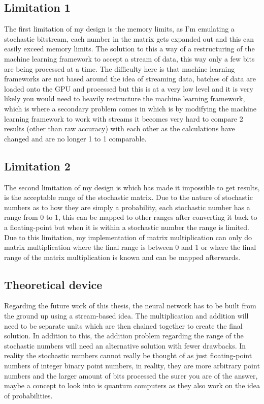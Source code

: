 \documentclass[a4paper,oneside,phd,etd]{BYUPhys}
\begin{document}
\subsection{Limitation 1}
The first limitation of my design is the memory limits, as I'm emulating a stochastic bitstream, each number in the matrix gets expanded out and this can easily exceed memory limits. The solution to this a way of a restructuring of the machine learning framework to accept a stream of data, this way only a few bits are being processed at a time. The difficulty here is that machine learning frameworks are not based around the idea of streaming data, batches of data are loaded onto the GPU and processed but this is at a very low level and it is very likely you would need to heavily restructure the machine learning framework, which is where a secondary problem comes in which is by modifying the machine learning framework to work with streams it becomes very hard to compare 2 results (other than raw accuracy) with each other as the calculations have changed and are no longer 1 to 1 comparable.

\subsection{Limitation 2}
The second limitation of my design is which has made it impossible to get results, is the acceptable range of the stochastic matrix. Due to the nature of stochastic numbers as to how they are simply a probability, each stochastic number has a range from 0 to 1, this can be mapped to other ranges after converting it back to a floating-point but when it is within a stochastic number the range is limited. Due to this limitation, my implementation of matrix multiplication can only do matrix multiplication where the final range is between 0 and 1 or where the final range of the matrix multiplication is known and can be mapped afterwards.

\subsection{Theoretical device}
Regarding the future work of this thesis, the neural network has to be built from the ground up using a stream-based idea. The multiplication and addition will need to be separate units which are then chained together to create the final solution. In addition to this, the addition problem regarding the range of the stochastic numbers will need an alternative solution with fewer drawbacks. In reality the stochastic numbers cannot really be thought of as just floating-point numbers of integer binary point numbers, in reality, they are more arbitrary point numbers and the larger amount of bits processed the surer you are of the answer, maybe a concept to look into is quantum computers as they also work on the idea of probabilities.
\end{document}
